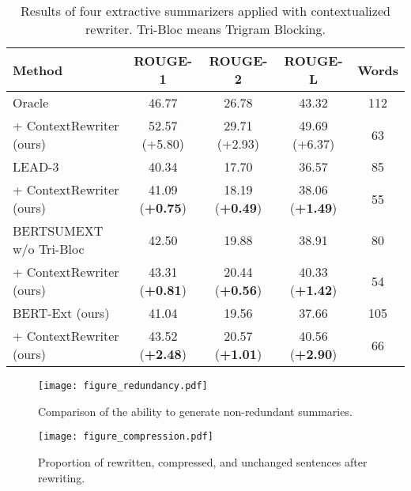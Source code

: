 \documentclass[letterpaper]{article} %
\begin{document}
\begin{table*}[t]
    \centering
    \begin{tabular}{lcccc}
        \hline
        \bf{Method} & \bf{ROUGE-1} & \bf{ROUGE-2} & \bf{ROUGE-L} & \bf{Words} \\
        \hline
        Oracle & 46.77 & 26.78 & 43.32 & 112 \\
        \hspace{1mm} + ContextRewriter (ours) & 52.57 (+5.80) & 29.71 (+2.93) & 49.69 (+6.37) & 63 \\
        \hline
        LEAD-3 & 40.34 & 17.70 & 36.57 & 85 \\
        \hspace{1mm} + ContextRewriter (ours) & 41.09 (\textbf{+0.75}) & 18.19 (\textbf{+0.49}) & 38.06 (\textbf{+1.49}) & 55 \\
        \hline
        BERTSUMEXT w/o Tri-Bloc & 42.50 & 19.88 & 38.91 & 80 \\
        \hspace{1mm} + ContextRewriter (ours) & 43.31 (\textbf{+0.81}) & 20.44 (\textbf{+0.56}) & 40.33 (\textbf{+1.42}) & 54 \\
        \hline
        BERT-Ext (ours) & 41.04 & 19.56 & 37.66 & 105 \\
        \hspace{1mm} + ContextRewriter (ours) & 43.52 (\textbf{+2.48}) & 20.57 (\textbf{+1.01}) & 40.56 (\textbf{+2.90}) & 66 \\
        \hline
    \end{tabular}
    \caption{Results of four extractive summarizers applied with contextualized rewriter. Tri-Bloc means Trigram Blocking. }
    \label{tab:extguidabs}
\end{table*}

\begin{figure*}[t]
   \begin{minipage}{0.65\textwidth}
     \centering
     \texttt{[image: figure\_redundancy.pdf]}
     \caption{Comparison of the ability to generate non-redundant summaries.}\label{fig:trigramblock}
   \end{minipage}\hfill
   \begin{minipage}{0.3\textwidth}
     \centering
     \texttt{[image: figure\_compression.pdf]}
     \caption{Proportion of rewritten, compressed, and unchanged sentences after rewriting.}\label{fig:compression}
   \end{minipage}
\end{figure*}
\end{document}
